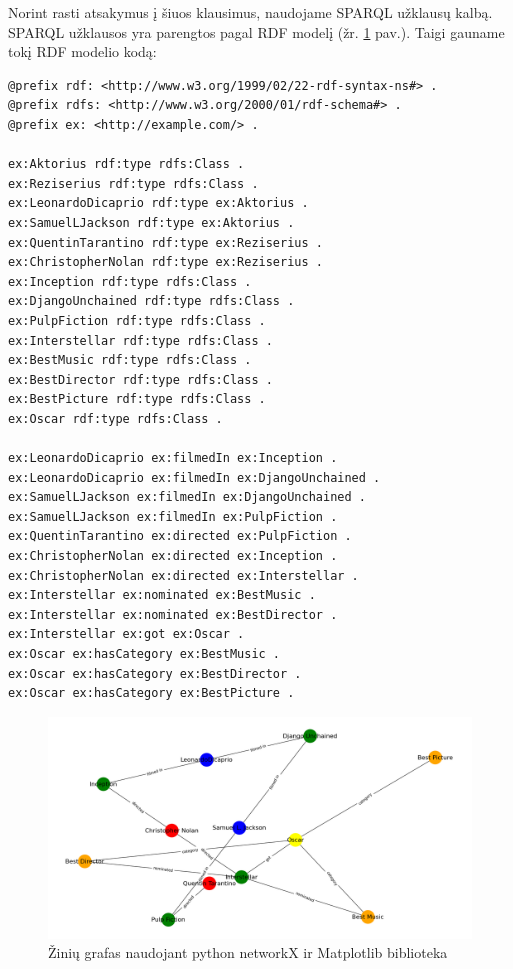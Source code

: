 \documentclass{VUMIFPSkursinis}
\begin{document}
Norint rasti atsakymus į šiuos klausimus, naudojame SPARQL užklausų kalbą. SPARQL užklausos yra parengtos pagal RDF modelį (žr. \ref{fig:last_graph_rdf} pav.). Taigi gauname tokį RDF modelio kodą:
\begin{lstlisting}[captionpos=b, caption=Pavyzdžio RDF modelis, label=lst:sparql,
   basicstyle=\ttfamily,frame=single]
@prefix rdf: <http://www.w3.org/1999/02/22-rdf-syntax-ns#> .
@prefix rdfs: <http://www.w3.org/2000/01/rdf-schema#> .
@prefix ex: <http://example.com/> .

ex:Aktorius rdf:type rdfs:Class .
ex:Reziserius rdf:type rdfs:Class .
ex:LeonardoDicaprio rdf:type ex:Aktorius .
ex:SamuelLJackson rdf:type ex:Aktorius .
ex:QuentinTarantino rdf:type ex:Reziserius .
ex:ChristopherNolan rdf:type ex:Reziserius .
ex:Inception rdf:type rdfs:Class .
ex:DjangoUnchained rdf:type rdfs:Class .
ex:PulpFiction rdf:type rdfs:Class .
ex:Interstellar rdf:type rdfs:Class .
ex:BestMusic rdf:type rdfs:Class .
ex:BestDirector rdf:type rdfs:Class .
ex:BestPicture rdf:type rdfs:Class .
ex:Oscar rdf:type rdfs:Class .

ex:LeonardoDicaprio ex:filmedIn ex:Inception .
ex:LeonardoDicaprio ex:filmedIn ex:DjangoUnchained .
ex:SamuelLJackson ex:filmedIn ex:DjangoUnchained .
ex:SamuelLJackson ex:filmedIn ex:PulpFiction .
ex:QuentinTarantino ex:directed ex:PulpFiction .
ex:ChristopherNolan ex:directed ex:Inception .
ex:ChristopherNolan ex:directed ex:Interstellar .
ex:Interstellar ex:nominated ex:BestMusic .
ex:Interstellar ex:nominated ex:BestDirector .
ex:Interstellar ex:got ex:Oscar .
ex:Oscar ex:hasCategory ex:BestMusic .
ex:Oscar ex:hasCategory ex:BestDirector .
ex:Oscar ex:hasCategory ex:BestPicture .
\end{lstlisting}
\pagebreak

\begin{figure}[htbp]
  \centering
  \includegraphics[width=1\textwidth]{img/last_graph_rdf.png}
  \caption{Žinių grafas naudojant python networkX ir Matplotlib biblioteka}
  \label{fig:last_graph_rdf}
\end{figure}
\end{document}
